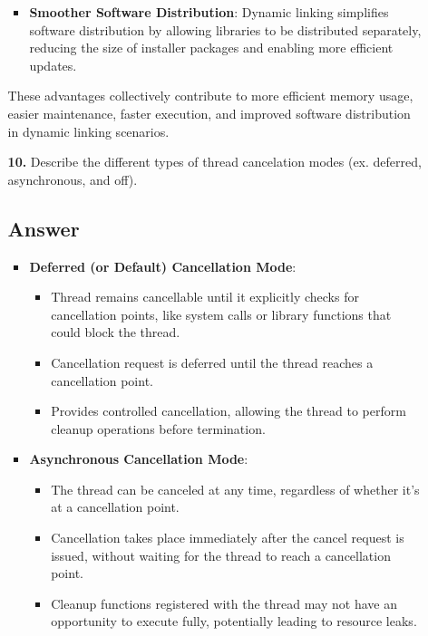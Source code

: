 \documentclass[12pt]{book}
\begin{document}
\begin{itemize}
\begin{itemize}
\begin{itemize}
                \item \textbf{Smoother Software Distribution}: Dynamic linking simplifies software distribution by allowing libraries to be distributed separately, reducing the size of installer packages and enabling more efficient updates.
            \end{itemize}
            These advantages collectively contribute to more efficient memory usage, easier maintenance, faster execution, and improved software distribution in dynamic linking scenarios.

            \item[\textbf{10.}] Describe the different types of thread cancelation modes (ex. deferred, asynchronous, and
            off).

            \subsection*{Answer}
            \begin{itemize}
                \item 
                \textbf{Deferred (or Default) Cancellation Mode}:
                
                \begin{itemize}
                    \item Thread remains cancellable until it explicitly checks for cancellation points, like system calls or library functions that could block the thread.
                    \item Cancellation request is deferred until the thread reaches a cancellation point.
                    \item Provides controlled cancellation, allowing the thread to perform cleanup operations before termination.
                \end{itemize}

                \item \textbf{Asynchronous Cancellation Mode}:
                
                \begin{itemize}
                    \item The thread can be canceled at any time, regardless of whether it's at a cancellation point.
                    \item Cancellation takes place immediately after the cancel request is issued, without waiting for the thread to reach a cancellation point.
                    \item Cleanup functions registered with the thread may not have an opportunity to execute fully, potentially leading to resource leaks.
                \end{itemize}



\end{itemize}
\end{itemize}
\end{itemize}
\end{document}
